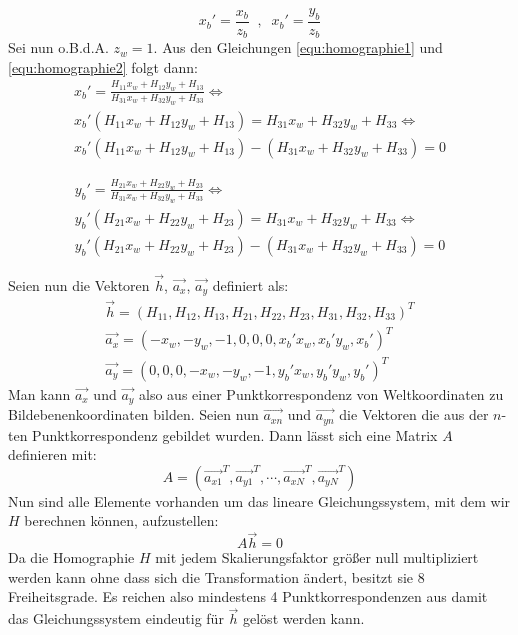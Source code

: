 \begin{equation}
\label{equ:homographie2}
	x_b\prime = \frac{x_b}{z_b} \;\;,\;\; x_b\prime = \frac{y_b}{z_b}
\end{equation} 
Sei nun o.B.d.A. \(z_w = 1\). Aus den Gleichungen \ref{equ:homographie1} und \ref{equ:homographie2} folgt dann:
\begin{gather}
\label{equ:homographie3}
	x_b\prime = \frac{H_{11}x_w + H_{12}y_w + H_{13}}{H_{31}x_w + H_{32}y_w + H_{33}} \Leftrightarrow \\
	x_b\prime \left( H_{11}x_w + H_{12}y_w + H_{13} \right) = H_{31}x_w + H_{32}y_w + H_{33}\Leftrightarrow \\
	x_b\prime \left( H_{11}x_w + H_{12}y_w + H_{13} \right) - \left( H_{31}x_w + H_{32}y_w + H_{33}\right) = 0
\end{gather}

\begin{gather}
\label{equ:homographie4}
	y_b\prime = \frac{H_{21}x_w + H_{22}y_w + H_{23}}{H_{31}x_w + H_{32}y_w + H_{33}} \Leftrightarrow \\
	y_b\prime \left( H_{21}x_w + H_{22}y_w + H_{23} \right) = H_{31}x_w + H_{32}y_w + H_{33}\Leftrightarrow \\
	y_b\prime \left( H_{21}x_w + H_{22}y_w + H_{23} \right) - \left( H_{31}x_w + H_{32}y_w + H_{33} \right) = 0
\end{gather}

Seien nun die Vektoren \(\vec{h}\), \(\vec{a_x}\), \(\vec{a_y}\) definiert als:
\begin{gather}
	\vec{h} = \left( H_{11}, H_{12}, H_{13}, H_{21}, H_{22}, H_{23}, H_{31}, H_{32}, H_{33} \right)^{T} \\
	\vec{a_x} = \left( -x_w, -y_w, -1, 0, 0, 0, x_b\prime x_w, x_b\prime y_w, x_b\prime \right)^{T} \\
	\vec{a_y} = \left( 0, 0, 0, -x_w, -y_w, -1, y_b\prime x_w, y_b\prime y_w, y_b\prime \right)^{T}
\end{gather}
Man kann \(\vec{a_{x}}\) und \(\vec{a_{y}}\) also aus einer Punktkorrespondenz von Weltkoordinaten zu Bildebenenkoordinaten bilden. Seien nun \(\vec{a_{xn}}\) und \(\vec{a_{yn}}\) die Vektoren die aus der \(n\)-ten Punktkorrespondenz gebildet wurden. Dann lässt sich eine Matrix \(A\) definieren mit:
\begin{equation}
	A = \left( \vec{a_{x1}}^{T}, \vec{a_{y1}}^{T}, \cdots , \vec{a_{xN}}^{T}, \vec{a_{yN}}^{T} \right)
\end{equation}
Nun sind alle Elemente  vorhanden um das lineare Gleichungssystem, mit dem wir \(H\) berechnen können, aufzustellen:
\begin{equation}
	A\vec{h} = 0
\end{equation}
Da die Homographie \(H\) mit jedem Skalierungsfaktor größer null multipliziert werden kann ohne dass sich die Transformation ändert, besitzt sie 8 Freiheitsgrade. Es reichen also mindestens 4 Punktkorrespondenzen aus damit das Gleichungssystem eindeutig für \(\vec{h}\) gelöst werden kann. 

